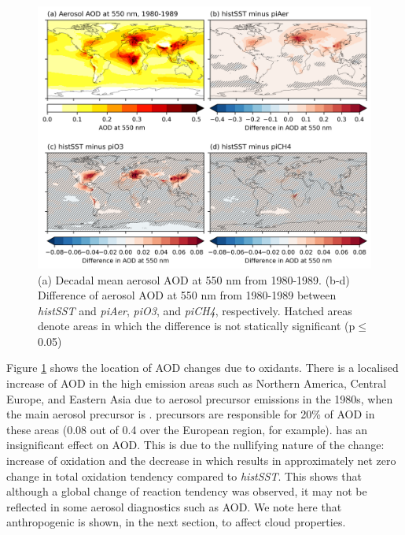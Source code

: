 \begin{figure}
    \centering
    \includegraphics[width=\linewidth]{Chapter3/Figs/f06_aod-map.png}
    \caption[Mean aerosol AOD at 550 nm from 1980-1989 and changes to AOD due to SLCFs]{(a) Decadal mean aerosol AOD at 550 nm from 1980-1989. (b-d) Difference of aerosol AOD at 550 nm from 1980-1989 between \textit{histSST} and \textit{piAer}, \textit{piO3}, and \textit{piCH4}, respectively. Hatched areas denote areas in which the difference is not statically significant (p$\leq$0.05)}
    \label{fig:ch3:AOD-map}
\end{figure}


Figure \ref{fig:ch3:AOD-map} shows the location of AOD changes due to oxidants. There is a localised increase of AOD in the high emission areas such as Northern America, Central Europe, and Eastern Asia due to aerosol precursor emissions in the 1980s, when the main aerosol precursor is .  precursors are responsible for 20\% of AOD in these areas (0.08 out of 0.4 over the European region, for example).  has an insignificant effect on AOD. This is due to the nullifying nature of the change: increase of  oxidation and the decrease in  which results in approximately net zero change in total oxidation tendency compared to \textit{histSST}. This shows that although a global change of reaction tendency was observed, it may not be reflected in some aerosol diagnostics such as AOD. We note here that anthropogenic  is shown, in the next section, to affect cloud properties.

